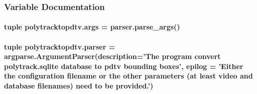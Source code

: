 \subsubsection{Variable Documentation}
\hypertarget{namespacepolytracktopdtv_a923d4b320d9e6b80c0c5cc82628a2e23}{
\paragraph[{args}]{\setlength{\rightskip}{0pt plus 5cm}tuple polytracktopdtv.\-args = parser.\-parse\-\_\-args()}}\label{namespacepolytracktopdtv_a923d4b320d9e6b80c0c5cc82628a2e23}
\hypertarget{namespacepolytracktopdtv_ab8b5e788f5c71bf5c9e3fd8aa2d2b83a}{
\paragraph[{parser}]{\setlength{\rightskip}{0pt plus 5cm}tuple polytracktopdtv.\-parser = argparse.\-Argument\-Parser(description='The program convert polytrack.\-sqlite database to pdtv bounding boxes', epilog = 'Either the configuration filename or the other parameters (at least video and database filenames) need to be provided.')}}\label{namespacepolytracktopdtv_ab8b5e788f5c71bf5c9e3fd8aa2d2b83a}
